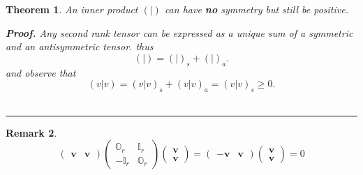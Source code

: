 \documentclass[aps,preprint]{revtex4}
\newtheorem{theorem}{Theorem}
\newtheorem{remark}[theorem]{Remark}
\newenvironment{proof}[1][Proof]{\noindent\textbf{#1.} }{\ \rule{0.5em}{0.5em}}
\begin{document}
\begin{theorem}
An inner product $\left( \left. {}\right\vert \right) $ can have \textbf{no}
symmetry but still be positive.

\begin{proof}
Any second rank tensor can be expressed as a unique sum of a symmetric and
an antisymmetric tensor. thus 
\begin{equation}
\left( \left. {}\right\vert \right) =\left( \left. {}\right\vert \right)
_{s}+\left( \left. {}\right\vert \right) _{a}.
\end{equation}%
and observe that 
\begin{equation}
\left( \left. v\right\vert v\right) =\left( \left. v\right\vert v\right)
_{s}+\left( \left. v\right\vert v\right) _{a}=\left( \left. v\right\vert
v\right) _{s}\geq 0.
\end{equation}
\end{proof}
\end{theorem}

\begin{remark}
\begin{equation}
\left( 
\begin{array}{cc}
\mathbf{v} & \mathbf{v}%
\end{array}%
\right) \left( 
\begin{array}{cc}
\mathbb{O}_{r} & \mathbb{I}_{r} \\ 
-\mathbb{I}_{r} & \mathbb{O}_{r}%
\end{array}%
\right) \left( 
\begin{array}{c}
\mathbf{v} \\ 
\mathbf{v}%
\end{array}%
\right) =\left( 
\begin{array}{cc}
-\mathbf{v} & \mathbf{v}%
\end{array}%
\right) \left( 
\begin{array}{c}
\mathbf{v} \\ 
\mathbf{v}%
\end{array}%
\right) =0
\end{equation}
\end{remark}
\end{document}
